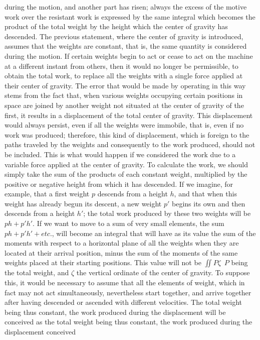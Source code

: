 \documentclass{book}
\begin{document}
during the motion, and another part has risen; always the excess of the motive work over the resistant work is expressed by the same integral which becomes the product of the total weight by the height which the center of gravity has descended.
The previous statement, where the center of gravity is introduced, assumes that the weights are constant, that is, the same quantity is considered during the motion. If certain weights begin to act or cease to act on the machine at a different instant from others, then it would no longer be permissible, to obtain the total work, to replace all the weights with a single force applied at their center of gravity.
The error that would be made by operating in this way stems from the fact that, when various weights occupying certain positions in space are joined by another weight not situated at the center of gravity of the first, it results in a displacement of the total center of gravity. This displacement would always persist, even if all the weights were immobile, that is, even if no work was produced; therefore, this kind of displacement, which is foreign to the paths traveled by the weights and consequently to the work produced, should not be included. This is what would happen if we considered the work due to a variable force applied at the center of gravity. To calculate the work, we should simply take the sum of the products of each constant weight, multiplied by the positive or negative height from which it has descended. If we imagine, for example, that a first weight \(p\) descends from a height \(h\), and that when this weight has already begun its descent, a new weight \(p'\) begins its own and then descends from a height \(h'\); the total work produced by these two weights will be \(ph + p'h'\). If we want to move to a sum of very small elements, the sum \(ph + p'h'+etc.\), will become an integral that will have as its value the sum of the moments with respect to a horizontal plane of all the weights when they are located at their arrival position, minus the sum of the moments of the same weights placed at their starting positions. 
This value will not be 
\(\iint P\zeta\)\, \(P\) being the total weight, and \(\zeta\) the vertical ordinate of the center of gravity. To suppose this, it would be necessary to assume that all the elements of weight, which in fact may not act simultaneously, nevertheless start together, and arrive together after having descended or ascended with different velocities. The total weight being thus constant, the work produced during the displacement will be conceived as the total weight being thus constant, the work produced during the displacement conceived 
\end{document}
